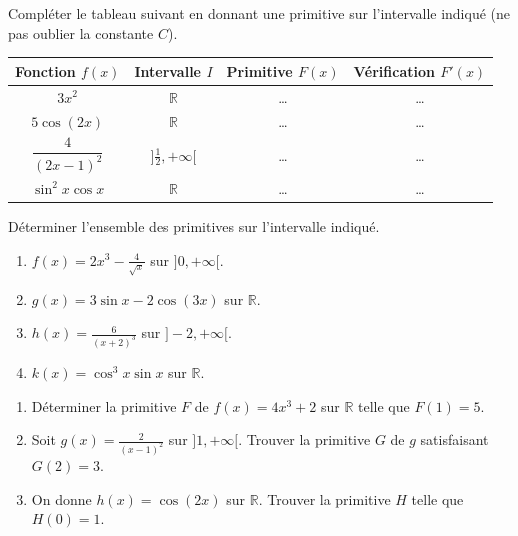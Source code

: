 \documentclass[11pt]{article}
\begin{document}
\begin{exercice}
Compléter le tableau suivant en donnant une primitive sur l'intervalle indiqué (ne pas oublier la constante $C$).

\begin{center}
\begin{tabular}{|c|c|c|c|}
\hline
Fonction $f(x)$ & Intervalle $I$ & Primitive $F(x)$ & Vérification $F'(x)$ \\
\hline
$3x^2$ & $\mathbb{R}$ & \ldots & \ldots \\
\hline
$5\cos(2x)$ & $\mathbb{R}$ & \ldots & \ldots \\
\hline
$\dfrac{4}{(2x-1)^2}$ & $]\frac12, +\infty[$ & \ldots & \ldots \\
\hline
$\sin^2 x \cos x$ & $\mathbb{R}$ & \ldots & \ldots \\
\hline
\end{tabular}
\end{center}
\end{exercice}

\begin{exercice}
Déterminer l'ensemble des primitives sur l'intervalle indiqué.
\begin{enumerate}
    \item $f(x) = 2x^3 - \frac{4}{\sqrt{x}}$ sur $]0, +\infty[$.
    \item $g(x) = 3\sin x - 2\cos(3x)$ sur $\mathbb{R}$.
    \item $h(x) = \frac{6}{(x+2)^3}$ sur $]-2, +\infty[$.
    \item $k(x) = \cos^3 x \sin x$ sur $\mathbb{R}$.
\end{enumerate}
\end{exercice}

\begin{exercice}
\begin{enumerate}
    \item Déterminer la primitive $F$ de $f(x)=4x^3+2$ sur $\mathbb{R}$ telle que $F(1)=5$.
    \item Soit $g(x) = \frac{2}{(x-1)^2}$ sur $]1, +\infty[$. Trouver la primitive $G$ de $g$ satisfaisant $G(2)=3$.
    \item On donne $h(x) = \cos(2x)$ sur $\mathbb{R}$. Trouver la primitive $H$ telle que $H(0)=1$.
\end{enumerate}
\end{exercice}
\end{document}
